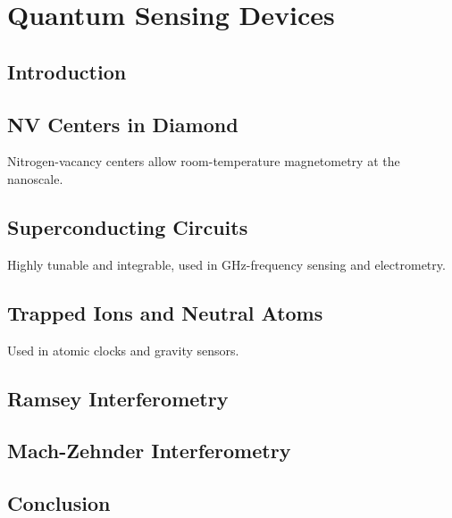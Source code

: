 \chapter{Quantum Sensing Devices}
\section{Introduction}

\section{NV Centers in Diamond}

Nitrogen-vacancy centers allow room-temperature magnetometry at the nanoscale.

\section{Superconducting Circuits}

Highly tunable and integrable, used in GHz-frequency sensing and electrometry.

\section{Trapped Ions and Neutral Atoms}

Used in atomic clocks and gravity sensors.

\section{Ramsey Interferometry}

\section{Mach-Zehnder Interferometry}

\section{Conclusion}
